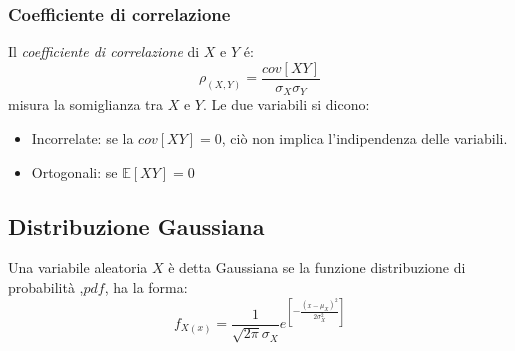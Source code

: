         \subsubsection{Coefficiente di correlazione}
            Il \emph{coefficiente di correlazione} di $X$ e $Y$ é:
            \[
                \rho_{(X,Y)} = \frac{cov[XY]}{\sigma_X\sigma_Y}
            \]
            misura la somiglianza tra $X$ e $Y$. Le due variabili si dicono:
            \begin{itemize}
                \item {
                    Incorrelate: se la $cov[XY] =0$, ciò non implica l'indipendenza delle variabili.
                }
                \item {
                    Ortogonali: se $\mathbb{E}[XY] = 0$
                }
            \end{itemize}
    \subsection{Distribuzione Gaussiana}
        Una variabile aleatoria $X$ è detta Gaussiana se la funzione distribuzione di probabilità ,$pdf$, ha la forma:
        \[
            f_{X(x)} = \frac{1}{\sqrt{2\pi}\sigma_X}e^{\left[\displaystyle -\frac{(x-\mu_X)^2}{2\sigma^2_X}\right]}  
        \]
